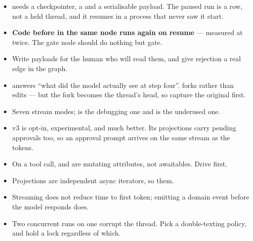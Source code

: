 \begin{itemize}[leftmargin=1.4em]
\item {} needs a checkpointer, a  and a
      serialisable payload. The paused run is a row, not a held thread, and it
      resumes in a process that never saw it start.
\item \textbf{Code before  in the same node runs again on
      resume} --- measured at twice. The gate node should do nothing but gate.
\item Write payloads for the human who will read them, and give rejection a real
      edge in the graph.
\item {} answers ``what did the model actually see at step
      four''.  forks rather than edits --- but the fork becomes
      the thread's head, so capture the original  first.
\item Seven stream modes;  is the debugging one and 
      is the underused one.
\item v3 is opt-in, experimental, and much better. Its projections carry
      pending approvals too, so an approval prompt arrives on the same stream as
      the tokens.
\item On a tool call,  and  are mutating attributes,
      not awaitables. Drive  first.
\item Projections are independent async iterators, so  them.
\item Streaming does not reduce time to first token; emitting a domain event
      before the model responds does.
\item Two concurrent runs on one  corrupt the thread. Pick a
      double-texting policy, and hold a lock regardless of which.
\end{itemize}

